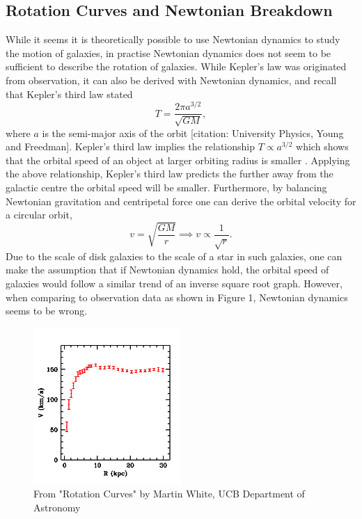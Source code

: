\documentclass[11pt, twocolumn]{article}
\newcommand{\ff}[2]{\frac{#1}{#2}}
\begin{document}
	\subsection*{Rotation Curves and Newtonian Breakdown}
	While it seems it is theoretically possible to use Newtonian dynamics to study the motion of galaxies, in practise Newtonian dynamics does not seem to be sufficient to describe the rotation of galaxies. While Kepler's law was originated from observation, it can also be derived with Newtonian dynamics, and recall that Kepler's third law stated \begin{equation} T = \ff{2\pi a^{3/2}}{\sqrt{GM}}, \end{equation} where \( a \) is the semi-major axis of the orbit [citation: University Physics, Young and Freedman]. Kepler's third law implies the relationship \( T \propto a^{3/2} \) which shows that the orbital speed of an object at larger orbiting radius is smaller \parencite{korista_understanding_nodate}.
    Applying the above relationship, Kepler's third law predicts the further away from the galactic centre the orbital speed will be smaller. Furthermore, by balancing Newtonian gravitation and centripetal force one can derive the orbital velocity for a circular orbit, \begin{equation} v = \sqrt{\ff{GM}{r}} \implies v \propto \ff{1}{\sqrt{r}}. \end{equation} Due to the scale of disk galaxies to the scale of a star in such galaxies, one can make the assumption that if Newtonian dynamics hold, the orbital speed of galaxies would follow a similar trend of an inverse square root graph. However, when comparing to observation data as shown in Figure 1, Newtonian dynamics seems to be wrong.

    \begin{figure}[h]
        \includegraphics[width=0.5\textwidth]{images/rotation.jpg}
        \caption{From "Rotation Curves" by Martin White, UCB Department of Astronomy}
        \label{fig:rotation}
    \end{figure}
    
\end{document}
